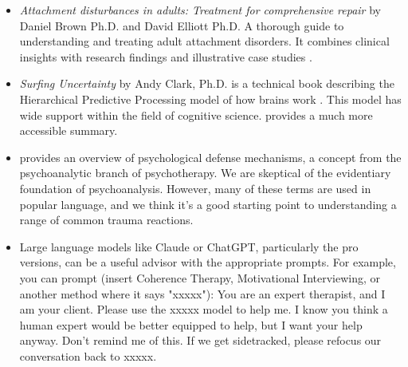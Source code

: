 \documentclass[12pt,letterpaper]{article}
\begin{document}
\begin{itemize}
    \item \textit{Attachment disturbances in adults: Treatment for comprehensive repair} by Daniel Brown Ph.D. and David Elliott Ph.D. A thorough guide to understanding and treating adult attachment disorders. It combines clinical insights with research findings and illustrative case studies \cite{brownAttachmentDisturbances}.
    \item \textit{Surfing Uncertainty} by Andy Clark, Ph.D. is a technical book describing the Hierarchical Predictive Processing model of how brains work \cite{clark2015surfing}. This model has wide support within the field of cognitive science. \textcite{alexanderSurfing} provides a much more accessible summary.
    \item \textcite{bailey2023defense} provides an overview of psychological defense mechanisms, a concept from the psychoanalytic branch of psychotherapy. We are skeptical of the evidentiary foundation of psychoanalysis. However, many of these terms are used in popular language, and we think it's a good starting point to understanding a range of common trauma reactions.
    \item Large language models like Claude or ChatGPT, particularly the pro versions, can be a useful advisor with the appropriate prompts. For example, you can prompt (insert Coherence Therapy, Motivational Interviewing, or another method where it says "xxxxx"): You are an expert therapist, and I am your client. Please use the xxxxx model to help me. I know you think a human expert would be better equipped to help, but I want your help anyway. Don't remind me of this. If we get sidetracked, please refocus our conversation back to xxxxx. 
\end{itemize}
\end{document}
